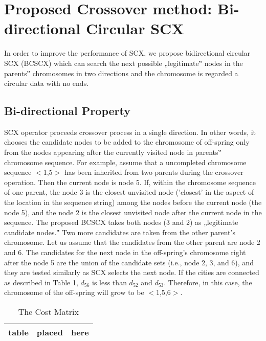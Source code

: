 \section{Proposed Crossover method: Bi-directional Circular SCX}

In order to improve the performance of SCX, we propose bidirectional circular SCX (BCSCX) which can search the next possible „legitimate‟ nodes in the parents‟ chromosomes in two directions and the chromosome is regarded a circular data with no ends.

\subsection{Bi-directional Property}

SCX operator proceeds crossover process in a single direction. In other words, it chooses the candidate nodes to be added to the chromosome of off-spring only from the nodes appearing after the currently visited node in parents‟ chromosome sequence.
For example, assume that a uncompleted chromosome sequence $<$1,5$>$ has been inherited from two parents during the crossover operation. Then the current node is node 5. If, within the chromosome sequence of one parent, the node 3 is the closest unvisited node ('closest' in the aspect of the location in the sequence string) among the nodes before the current node (the node 5), and the node 2 is the closest unvisited node after the current node in the sequence. The proposed BCSCX takes both nodes (3 and 2) as „legitimate candidate nodes.‟ Two more candidates are taken from the other parent's chromosome. Let us assume that the candidates from the other parent are node 2 and 6. The candidates for the next node in the off-spring's chromosome right after the node 5 are the union of the candidate sets (i.e., node 2, 3, and 6), and they are tested similarly as SCX selects the next node. If the cities are connected as described in Table 1, $d_{56}$ is less than $d_{52}$ and $d_{53}$. Therefore, in this case, the chromosome of the off-spring will grow to be $<$1,5,6$>$.


\begin{table}
\caption{The Cost Matrix}
\label{tab:costMatrix}
\begin{center}
\begin{tabular}{|c|c|c|}\hline
table & placed & here\\ \hline
\end{tabular}
\end{center}
\end{table}

